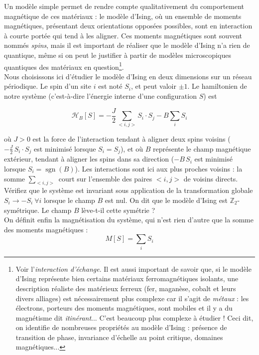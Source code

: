 \documentclass{book}
\begin{document}
Un modèle simple permet de rendre compte qualitativement du comportement magnétique de ces matériaux : le modèle d'Ising, où un ensemble de moments magnétiques, présentant deux orientations opposées possibles, sont en interaction à courte portée qui tend à les aligner. Ces moments magnétiques sont souvent nommés \emph{spins}, mais il est important de réaliser que le modèle d'Ising n'a rien de quantique, même si on peut le justifier à partir de modèles microscopiques quantiques des matériaux en question\footnote{Voir l'\emph{interaction d'échange}. Il est aussi important de savoir que, si le modèle d'Ising représente bien certains matériaux ferromagnétiques isolants, une description réaliste des matérieux ferreux (fer, maganèse, cobalt et leurs divers alliages) est nécessairement plus complexe car il s'agit de \emph{métaux} : les électrons, porteurs des moments magnétiques, sont mobiles et il y a du magnétisme dit \emph{itinérant}... C'est beaucoup plus complexe à étudier ! Ceci dit, on identifie de nombreuses propriétés au modèle d'Ising : présence de transition de phase, invariance d'échelle au point critique, domaines magnétiques...}.\\

Nous choisissons ici d'étudier le modèle d'Ising en deux dimensions sur un réseau périodique. Le spin d'un site $i$ est noté $S_i$, et peut valoir $\pm 1$. Le hamiltonien de notre système (c'est-à-dire l'énergie interne d'une configuration $S$) est

\begin{equation}
\mathcal{H}_B[S] = -\frac{J}{2}\sum_{<i,j>}S_i\cdot S_j-B\sum_i S_i
\end{equation}

où $J>0$ est la force de l'interaction tendant à aligner deux spins voisins ($-\frac{J}{2}\,S_i\cdot S_j$ est minimisé lorsque $S_i=S_j$), et où $B$ représente le champ magnétique extérieur, tendant à aligner les spins dans sa direction ($-B\,S_i$ est minimisé lorsque $S_i=\operatorname{sgn}(B)$). Les interactions sont ici aux plus proches voisins : la somme $\sum_{<i,j>}$ court sur l'ensemble des paires $<\!i,j\!>$ de voisins directs. Vérifiez que le système est invariant sous application de la transformation globale $S_i\to-S_i\ \forall i$ lorsque le champ $B$ est nul. On dit que le modèle d'Ising est $\mathbb{Z}_2$-symétrique. Le champ $B$ lève-t-il cette symétrie ?\\

On définit enfin la magnétisation du système, qui n'est rien d'autre que la somme des moments magnétiques :
\begin{equation}
 M[S] = \sum_i S_i
\end{equation}
\end{document}
